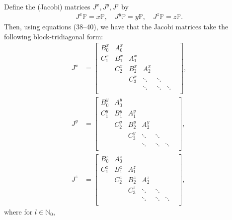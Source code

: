 \documentclass[11pt, oneside]{article}   	%
\newcommand{\No}{\mathbb{N}_0}
\newcommand{\bigP}{\mathbb{P}}
\begin{document}
Define the (Jacobi) matrices \(J^x, J^y, J^z\) by 
\begin{align}
J^x \bigP = x \bigP, \quad J^y \bigP = y \bigP, \quad J^z \bigP = z \bigP.
\end{align}
Then, using equations (38--40), we have that the Jacobi matrices take the following block-tridiagonal form:
\begin{align}
J^x &= \begin{bmatrix}
		B^x_0 & A^x_0 & & & & \\
		C^x_1 & B^x_1 & A^x_1 & & & \\
		& C^x_2 & B^x_2 & A^x_2  & & & \\
		& & C^x_3 & \ddots & \ddots & \\
		& & & \ddots & \ddots & \ddots \\
	\end{bmatrix}, \\
J^y &= \begin{bmatrix}
		B^y_0 & A^y_0 & & & & \\
		C^y_1 & B^y_1 & A^y_1 & & & \\
		& C^y_2 & B^y_2 & A^y_2  & & & \\
		& & C^y_3 & \ddots & \ddots & \\
		& & & \ddots & \ddots & \ddots \\
	\end{bmatrix}, \\
J^z &= \begin{bmatrix}
		B^z_0 & A^z_0 & & & & \\
		C^z_1 & B^z_1 & A^z_1 & & & \\
		& C^z_2 & B^z_2 & A^z_2  & & & \\
		& & C^z_3 & \ddots & \ddots & \\
		& & & \ddots & \ddots & \ddots \\
	\end{bmatrix},
\end{align}
where for \(l \in \No\),
\end{document}
